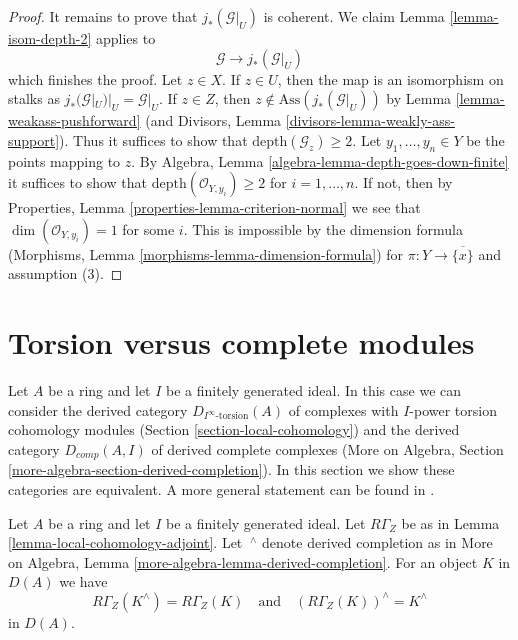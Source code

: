 \begin{proof}
\medskip\noindent
It remains to prove that $j_*(\mathcal{G}|_U)$ is coherent.
We claim Lemma \ref{lemma-isom-depth-2} applies to
$$
\mathcal{G} \longrightarrow j_*(\mathcal{G}|_U)
$$
which finishes the proof.
Let $z \in X$. If $z \in U$, then the map is an isomorphism
on stalks as $j_*(\mathcal{G}|_U)|_U = \mathcal{G}|_U$.
If $z \in Z$, then $z \not \in \text{Ass}(j_*(\mathcal{G}|_U))$ by
Lemma \ref{lemma-weakass-pushforward}
(and Divisors, Lemma \ref{divisors-lemma-weakly-ass-support}).
Thus it suffices to show that $\text{depth}(\mathcal{G}_z) \geq 2$.
Let $y_1, \ldots, y_n \in Y$ be the points mapping to $z$.
By Algebra, Lemma \ref{algebra-lemma-depth-goes-down-finite}
it suffices to show that
$\text{depth}(\mathcal{O}_{Y, y_i}) \geq 2$ for $i = 1, \ldots, n$.
If not, then by Properties, Lemma \ref{properties-lemma-criterion-normal}
we see that $\dim(\mathcal{O}_{Y, y_i}) = 1$ for some $i$.
This is impossible by the dimension formula
(Morphisms, Lemma \ref{morphisms-lemma-dimension-formula})
for $\pi : Y \to \overline{\{x\}}$ and assumption (3).
\end{proof}





\section{Torsion versus complete modules}
\label{section-torsion-and-complete}

\noindent
Let $A$ be a ring and let $I$ be a finitely generated ideal.
In this case we can consider the derived category
$D_{I^\infty\text{-torsion}}(A)$ of complexes
with $I$-power torsion cohomology modules
(Section \ref{section-local-cohomology})
and the derived category
$D_{comp}(A, I)$ of derived complete complexes
(More on Algebra, Section \ref{more-algebra-section-derived-completion}).
In this section we show these categories are equivalent.
A more general statement can be found in
\cite{Dwyer-Greenlees}.

\begin{lemma}
\label{lemma-complete-and-local}
Let $A$ be a ring and let $I$ be a finitely generated ideal.
Let $R\Gamma_Z$ be as in Lemma \ref{lemma-local-cohomology-adjoint}.
Let ${\ }^\wedge$ denote derived completion as in
More on Algebra, Lemma \ref{more-algebra-lemma-derived-completion}.
For an object $K$ in $D(A)$ we have
$$
R\Gamma_Z(K^\wedge) = R\Gamma_Z(K)
\quad\text{and}\quad
(R\Gamma_Z(K))^\wedge = K^\wedge
$$
in $D(A)$.
\end{lemma}

